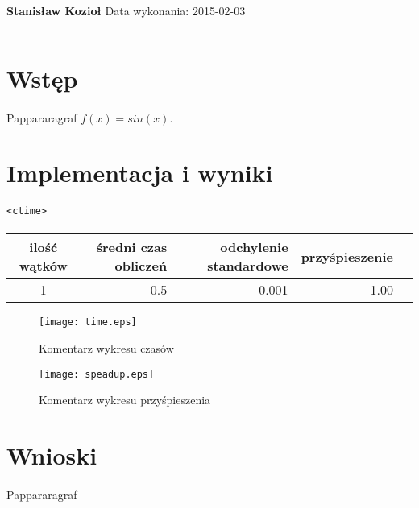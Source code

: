 \documentclass[10pt,a4paper]{article}
\begin{document}
\textbf{\LARGE Stanisław Kozioł}
Data wykonania: 2015-02-03
\vspace{0.2cm}
\hrule

\section{Wstęp}

\paragraph{}
Pappararagraf $f(x)=sin(x)$.

\section{Implementacja i wyniki}

\paragraph{}
\begin{lstlisting}
<ctime>
\end{lstlisting}

\paragraph{}
\begin{centering}
\begin{tabular}{|c|r|r|r|r|}
\hline
ilość wątków & średni czas obliczeń & odchylenie standardowe & przyśpieszenie \tabularnewline
\hline
 1 & 0.5 & 0.001 & 1.00\tabularnewline
\hline
\end{tabular}
\par\end{centering}

\begin{figure}[!hbp]
\begin{center}
  \texttt{[image: time.eps]}
  \caption{Komentarz wykresu czasów}
\end{center}
\end{figure}

\clearpage

\begin{figure}[!hbp]
\begin{center}
  \texttt{[image: speadup.eps]}
  \caption{Komentarz wykresu przyśpieszenia}
\end{center}
\end{figure}

\section{Wnioski}

\paragraph{}
Pappararagraf
\end{document}

